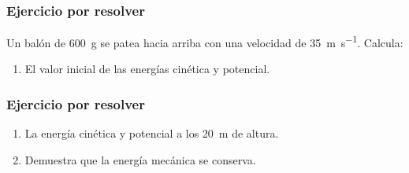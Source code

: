 \documentclass[14pt]{beamer}
\begin{document}
\begin{frame}
\frametitle{Ejercicio por resolver}
Un balón de \SI{600}{\gram} se patea hacia  arriba con una velocidad de \SI{35}{\meter\per\second}. \pause Calcula:
\pause
{}
\begin{enumerate}[<+->]
\item El valor inicial de las energías cinética y potencial.
\seti
\end{enumerate}
\end{frame}
\begin{frame}
\frametitle{Ejercicio por resolver}
\begin{enumerate}[<+->]    
\conti
\item La energía cinética y potencial a los \SI{20}{\meter} de altura.
\item Demuestra que la energía mecánica se conserva.
\end{enumerate}
\end{frame}
    
\end{document}
